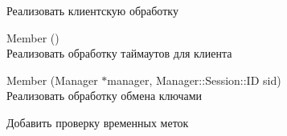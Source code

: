 \begin{DoxyRefList}
\label{todo__todo000022}%
%
Реализовать клиентскую обработку  
\item[Member \doxylink{class_g_n_e_t_1_1_g_query_passwd_ae5668da612a602d47616af3169a73a41}{GNET\+::GQuery\+Passwd\+::On\+Timeout} ()]\hfill \\
\label{todo__todo000023}%
%
Реализовать обработку таймаутов для клиента  
\item[Member \doxylink{class_g_n_e_t_1_1_key_exchange_a59d9dff58cb00261d155d622d24af391}{GNET\+::Key\+Exchange\+::Process} (Manager \texorpdfstring{$\ast$}{*}manager, Manager\+::\+Session\+::\+ID sid)]\hfill \\
\label{todo__todo000024}%
%
Реализовать обработку обмена ключами 



Добавить проверку временных меток 




\end{DoxyRefList}

